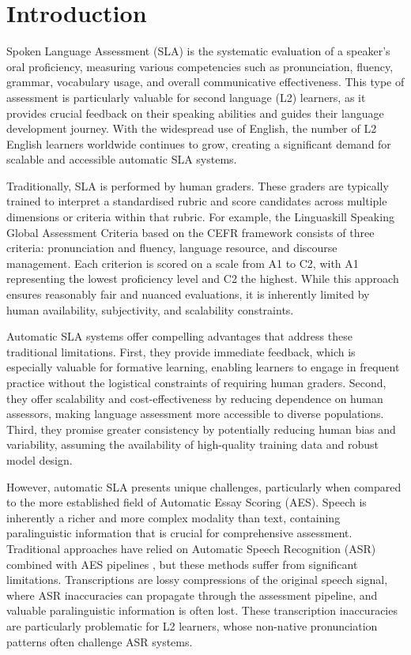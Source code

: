 \documentclass{report}
\begin{document}
\chapter{Introduction}
\label{chap:introduction}
Spoken Language Assessment (SLA) is the systematic evaluation of a speaker's oral proficiency, measuring various competencies such as pronunciation, fluency, grammar, vocabulary usage, and overall communicative effectiveness. This type of assessment is particularly valuable for second language (L2) learners, as it provides crucial feedback on their speaking abilities and guides their language development journey. With the widespread use of English, the number of L2 English learners worldwide continues to grow, creating a significant demand for scalable and accessible automatic SLA systems.

Traditionally, SLA is performed by human graders. These graders are typically trained to interpret a standardised rubric and score candidates across multiple dimensions or criteria within that rubric. For example, the Linguaskill Speaking Global Assessment Criteria \citep{cambridge2020linguaskill} based on the CEFR framework \citep{CouncilOfEurope2001CEFR} consists of three criteria: pronunciation and fluency, language resource, and discourse management. Each criterion is scored on a scale from A1 to C2, with A1 representing the lowest proficiency level and C2 the highest. While this approach ensures reasonably fair and nuanced evaluations, it is inherently limited by human availability, subjectivity, and scalability constraints.

Automatic SLA systems offer compelling advantages that address these traditional limitations. First, they provide immediate feedback, which is especially valuable for formative learning, enabling learners to engage in frequent practice without the logistical constraints of requiring human graders. Second, they offer scalability and cost-effectiveness by reducing dependence on human assessors, making language assessment more accessible to diverse populations. Third, they promise greater consistency by potentially reducing human bias and variability, assuming the availability of high-quality training data and robust model design.

However, automatic SLA presents unique challenges, particularly when compared to the more established field of Automatic Essay Scoring (AES). Speech is inherently a richer and more complex modality than text, containing paralinguistic information that is crucial for comprehensive assessment. Traditional approaches have relied on Automatic Speech Recognition (ASR) combined with AES pipelines \citep{bert_1,raina20_interspeech}, but these methods suffer from significant limitations. Transcriptions are lossy compressions of the original speech signal, where ASR inaccuracies can propagate through the assessment pipeline, and valuable paralinguistic information is often lost. These transcription inaccuracies are particularly problematic for L2 learners, whose non-native pronunciation patterns often challenge ASR systems.
\end{document}
